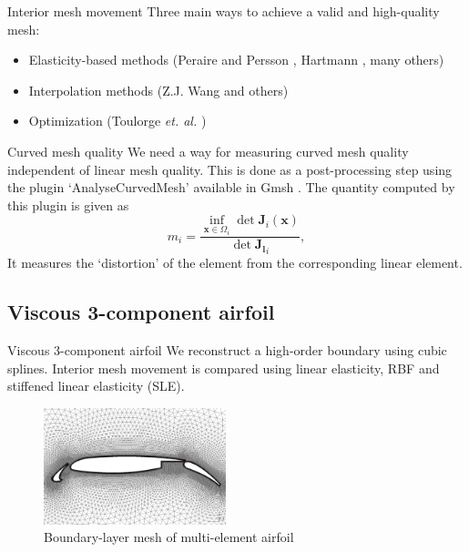 \documentclass[t,12pt]{beamer}
\begin{document}
\begin{frame}{Interior mesh movement}
Three main ways to achieve a valid and high-quality mesh:
\begin{itemize}
\item Elasticity-based methods (Peraire and Persson \cite{curve:persson}, Hartmann \cite{curve:hartmann}, many others)
\item Interpolation methods (Z.J. Wang \cite{curve:meshcurve} and others)
\item Optimization (Toulorge \emph{et. al.} \cite{gmsh:untangling})
\end{itemize}
\end{frame}

\begin{frame}{Curved mesh quality}
We need a way for measuring curved mesh quality independent of linear mesh quality. This is done as a post-processing step using the plugin `AnalyseCurvedMesh' available in Gmsh . The quantity computed by this plugin is given as
\begin{equation} 
m_i = \frac{\inf_{\mathbf{x}\in\Omega_i}\det \mathbf{J}_i(\mathbf{x})}{\det \mathbf{J_l}_i},
\end{equation}
It measures the `distortion' of the element from the corresponding linear element.
\end{frame}

\subsection{Viscous 3-component airfoil}
\begin{frame}{Viscous 3-component airfoil}
We reconstruct a high-order boundary using cubic splines. Interior mesh movement is compared using linear elasticity, RBF and stiffened linear elasticity (SLE).
\begin{figure}
	\centering
	\includegraphics[width=150.0pt]{3compblack}
	\caption{Boundary-layer mesh of multi-element airfoil}
\end{figure}
\end{frame}
\end{document}
